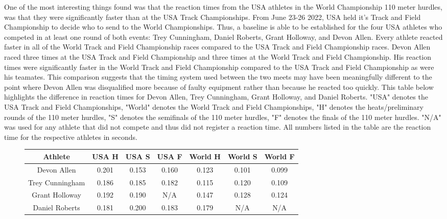 \documentclass[12pt, letterpaper, titlepage]{article}
\begin{document}
One of the most interesting things found was that the reaction times from the USA
athletes in the World Championship 110 meter hurdles, was that they were significantly
faster than at the USA Track Championships.  From June 23-26 2022, USA held it's Track
and Field Championship to decide who to send to the World Championships.  Thus, a baseline
is able to be established for the four USA athletes who competed in at least one round
of both events: Trey Cunningham, Daniel Roberts, Grant Holloway, and Devon Allen. Every
athlete reacted faster in all of the World Track and Field Championship races compared
to the USA Track and Field Championship races. Devon Allen raced three times at
the USA Track and Field Championship and three times at the World Track and Field 
Championship.  His reaction times were significantly faster in the World Track and
Field Championship compared to the USA Track and Field Championship as were his
teamates.  This comparison suggests that the timing system used between the two
meets may have been meaningfully different to the point where Devon Allen was
disqualified more because of faulty equipment rather than because he reacted
too quickly.  This table below highlights the difference in reaction times for
Devon Allen, Trey Cunningham, Grant Holloway, and Daniel Roberts. "USA" denotes
the USA Track and Field Championships, "World" denotes the World Track and Field
Championships, "H" denotes the heats/preliminary rounds of the 110 meter hurdles,
"S" denotes the semifinals of the 110 meter hurdles, "F" denotes the finals of the
110 meter hurdles.  "N/A" was used for any athlete that did not compete and thus
did not register a reaction time.  All numbers listed in the table are the reaction
time for the respective athletes in seconds.

\begin{figure}
    \begin{center}
      \begin{tabular}{||c | c c c | c c c||} 
       \hline
       Athlete & USA H & USA S & USA F & World H & World S & World F \\ [0.5ex] 
       \hline\hline
       Devon Allen & 0.201 & 0.153 & 0.160 & 0.123 & 0.101 & 0.099 \\ 
       \hline
       Trey Cunningham & 0.186 & 0.185 & 0.182 & 0.115 & 0.120 & 0.109 \\
       \hline
       Grant Holloway & 0.192 & 0.190 & N/A & 0.147 & 0.128 & 0.124 \\
       \hline
       Daniel Roberts & 0.181 & 0.200 & 0.183 & 0.179 & N/A & N/A \\ [0.5ex]
       \hline
      \end{tabular}
      \end{center}
  
\end{figure}
\end{document}
